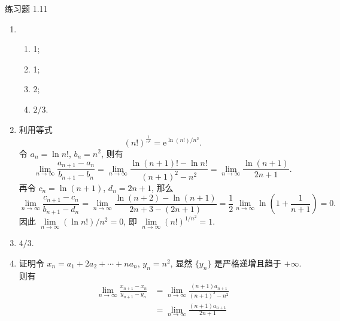 



% 


\begin{center}
    {\heiti 练习题 1.11}
\end{center}

\begin{enumerate}
    \item %
        \begin{enumerate}[(1)]
            \item %
                1;
            \item %
                1;
            \item %
                2;
            \item %
                $2/3$.
        \end{enumerate}
    \item %
        利用等式
        \[
            (n!)^{\frac{1}{n^2}} = \mathrm{e}^{\ln(n!)/n^2}.    
        \]
        令 $a_n = \ln n!$, $b_n = n^2$, 则有
        \[
            \lim_{n\to\infty}\frac{a_{n+1} - a_n}{b_{n+1} - b_n} = \lim_{n\to\infty}\frac{\ln(n+1)! - \ln n!}{(n+1)^2 - n^2} = \lim_{n\to\infty}\frac{\ln(n+1)}{2n+1}.
        \]
        再令 $c_n = \ln(n+1)$, $d_n = 2n+1$, 那么
        \[
            \lim_{n\to\infty}\frac{c_{n+1} - c_n}{b_{n+1} - d_n} = \lim_{n\to\infty}\frac{\ln(n+2) - \ln(n+1)}{2n+3 - (2n + 1)} = \frac12\lim_{n\to\infty}\ln\left(1 + \frac{1}{n+1}\right) = 0.    
        \]
        因此 $\lim\limits_{n\to\infty}(\ln n!)/n^2 = 0$, 即 $\lim\limits_{n\to\infty}(n!)^{1/n^2} = 1$.
    \item %
        $4/3$.
    \item %
        {\heiti 证明}\quad 令 $x_n = a_1 + 2a_2 + \cdots + na_n$, $y_n = n^2$, 显然 $\{y_n\}$ 是严格递增且趋于 $+\infty$.
        则有
        \begin{align*}
            \lim_{n\to\infty}\frac{x_{n+1} - x_n}{y_{n+1} - y_n} &= \lim_{n\to\infty}\frac{(n+1)a_{n+1}}{(n+1)^2 - n^2} \\
                                                                 &= \lim_{n\to\infty}\frac{(n+1)a_{n+1}}{2n + 1} \\

\end{align*}
\end{enumerate}
